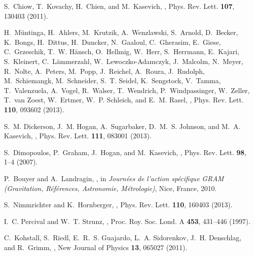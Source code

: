 \documentclass[11pt]{article}
\begin{document}
\begin{thebibliography}{100}
S.~Chiow, T.~Kovachy, H.~Chien, and M.~Kasevich,
,
\newblock Phys. Rev. Lett. {\bf 107}, 130403 (2011).

H.~Müntinga, H.~Ahlers, M.~Krutzik, A.~Wenzlawski, S.~Arnold, D.~Becker,
  K.~Bongs, H.~Dittus, H.~Duncker, N.~Gaaloul, C.~Gherasim, E.~Giese,
  C.~Grzeschik, T.~W. Hänsch, O.~Hellmig, W.~Herr, S.~Herrmann, E.~Kajari,
  S.~Kleinert, C.~Lämmerzahl, W.~Lewoczko-Adamczyk, J.~Malcolm, N.~Meyer,
  R.~Nolte, A.~Peters, M.~Popp, J.~Reichel, A.~Roura, J.~Rudolph,
  M.~Schiemangk, M.~Schneider, S.~T. Seidel, K.~Sengstock, V.~Tamma,
  T.~Valenzuela, A.~Vogel, R.~Walser, T.~Wendrich, P.~Windpassinger, W.~Zeller,
  T.~van Zoest, W.~Ertmer, W.~P. Schleich, and E.~M. Rasel,
,
\newblock Phys. Rev. Lett. {\bf 110}, 093602 (2013).

S.~M. Dickerson, J.~M. Hogan, A.~Sugarbaker, D.~M.~S. Johnson, and M.~A.
  Kasevich,
,
\newblock Phys. Rev. Lett. {\bf 111}, 083001 (2013).

S.~Dimopoulos, P.~Graham, J.~Hogan, and M.~Kasevich,
,
\newblock Phys. Rev. Lett. {\bf 98}, 1--4 (2007).

P.~Bouyer and A.~Landragin,
,
\newblock in {\em {Journ{\'e}es de l'action sp{\'e}cifique GRAM (Gravitation,
  R{\'e}f{\'e}rences, Astronomie, M{\'e}trologie)}}, Nice, France, 2010.

S.~Nimmrichter and K.~Hornberger,
,
\newblock Phys. Rev. Lett. {\bf 110}, 160403 (2013).

I.~C. Percival and W.~T. Strunz,
,
\newblock Proc. Roy. Soc. Lond. A {\bf 453}, 431--446 (1997).

C.~Kohstall, S.~Riedl, E.~R.~S. Guajardo, L.~A. Sidorenkov, J.~H. Denschlag,
  and R.~Grimm,
,
\newblock New Journal of Physics {\bf 13}, 065027 (2011).


\end{thebibliography}
\end{document}
